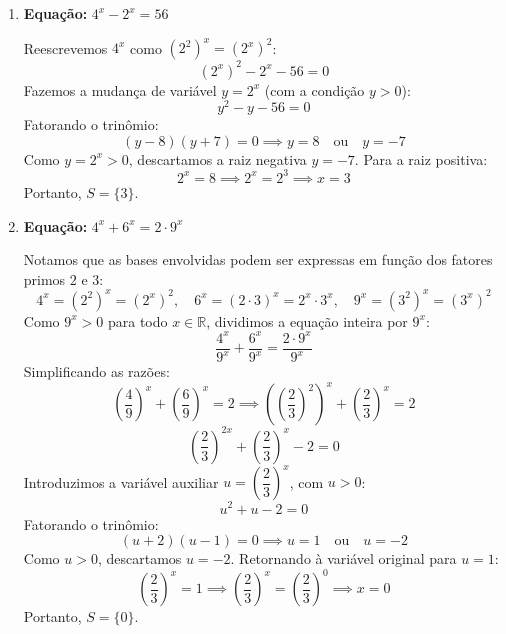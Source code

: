 \documentclass[12pt,a4paper]{report}
\begin{document}
\begin{enumerate}[label=\textbf{\arabic*.}]
	Expressamos todos os termos em função de $4^x$, lembrando que $2^{2x+1} = 2^{2x} \cdot 2^1 = (2^2)^x \cdot 2 = 2 \cdot 4^x$:
	\[
	2 \cdot 4^{x+2} = 2 \cdot 4^2 \cdot 4^x = 32 \cdot 4^x
	\]
	\[
	5 \cdot 4^{x+1} = 5 \cdot 4^1 \cdot 4^x = 20 \cdot 4^x
	\]
	\[
	3 \cdot 2^{2x+1} = 3 \cdot (2 \cdot 4^x) = 6 \cdot 4^x
	\]
	Substituindo na expressão original:
	\[
	32 \cdot 4^x - 20 \cdot 4^x - 6 \cdot 4^x - 1 \cdot 4^x = 20
	\]
	Reduzindo os termos semelhantes:
	\[
	(32 - 20 - 6 - 1) \cdot 4^x = 20 \implies 5 \cdot 4^x = 20 \implies 4^x = 4 \implies x = 1
	\]
	Portanto, $S = \{1\}$.
	
	\vspace{0.5cm}
	
	\item \textbf{Equação:} $4^x - 2^x = 56$
	
	Reescrevemos $4^x$ como $(2^2)^x = (2^x)^2$:
	\[
	(2^x)^2 - 2^x - 56 = 0
	\]
	Fazemos a mudança de variável $y = 2^x$ (com a condição $y > 0$):
	\[
	y^2 - y - 56 = 0
	\]
	Fatorando o trinômio:
	\[
	(y - 8)(y + 7) = 0 \implies y = 8 \quad \text{ou} \quad y = -7
	\]
	Como $y = 2^x > 0$, descartamos a raiz negativa $y = -7$. Para a raiz positiva:
	\[
	2^x = 8 \implies 2^x = 2^3 \implies x = 3
	\]
	Portanto, $S = \{3\}$.
	
	\vspace{0.5cm}
	
	\item \textbf{Equação:} $4^x + 6^x = 2 \cdot 9^x$
	
	Notamos que as bases envolvidas podem ser expressas em função dos fatores primos $2$ e $3$:
	\[
	4^x = (2^2)^x = (2^x)^2, \quad 6^x = (2 \cdot 3)^x = 2^x \cdot 3^x, \quad 9^x = (3^2)^x = (3^x)^2
	\]
	Como $9^x > 0$ para todo $x \in \mathbb{R}$, dividimos a equação inteira por $9^x$:
	\[
	\frac{4^x}{9^x} + \frac{6^x}{9^x} = \frac{2 \cdot 9^x}{9^x}
	\]
	Simplificando as razões:
	\[
	\left( \frac{4}{9} \right)^x + \left( \frac{6}{9} \right)^x = 2 \implies \left( \left( \frac{2}{3} \right)^2 \right)^x + \left( \frac{2}{3} \right)^x = 2
	\]
	\[
	\left( \frac{2}{3} \right)^{2x} + \left( \frac{2}{3} \right)^x - 2 = 0
	\]
	Introduzimos a variável auxiliar $u = \left( \dfrac{2}{3} \right)^x$, com $u > 0$:
	\[
	u^2 + u - 2 = 0
	\]
	Fatorando o trinômio:
	\[
	(u + 2)(u - 1) = 0 \implies u = 1 \quad \text{ou} \quad u = -2
	\]
	Como $u > 0$, descartamos $u = -2$. Retornando à variável original para $u = 1$:
	\[
	\left( \frac{2}{3} \right)^x = 1 \implies \left( \frac{2}{3} \right)^x = \left( \frac{2}{3} \right)^0 \implies x = 0
	\]
	Portanto, $S = \{0\}$.
	

\end{enumerate}
\end{document}
